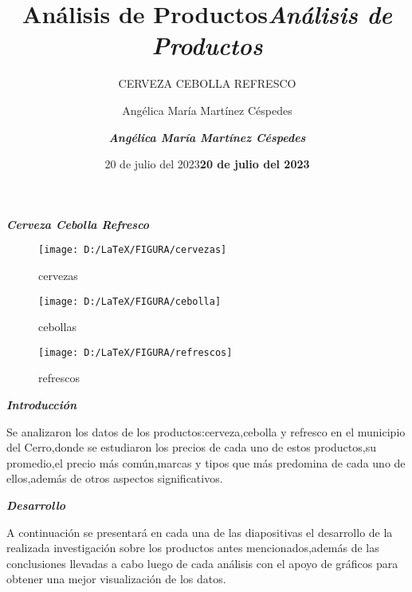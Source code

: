 \documentclass[10pt]{beamer}
\title{Análisis de Productos}
\author{Angélica María Martínez Céspedes}
\date{20 de julio del 2023}
\begin{document}
    \title{{\Huge \textbf{\textit{Análisis de Productos}}}}
    \author{\textbf{\textit{Angélica María Martínez Céspedes}}}
    \date{\textbf{20 de julio del 2023}}
    \subtitle{CERVEZA CEBOLLA REFRESCO}
  
   
   	\begin{frame}
   		\titlepage
   	\end{frame}
   	
   
   	
  
   	\begin{frame}
   		\begin{center}
   			{\LARGE{\textbf{\textit{Cerveza  Cebolla  Refresco}}}}
   		\end{center}
   		
   		\begin{figure}[p]
   			\centering
   			\texttt{[image: D:/LaTeX/FIGURA/cervezas]}
   			\caption{cervezas}
   			\label{fig:cervezas}
   		\end{figure}
   	
   	    \begin{figure}[t]
   		 \centering
   		 \texttt{[image: D:/LaTeX/FIGURA/cebolla]}
   	   	 \caption{cebollas}
   		 \label{fig:cebolla}
    	\end{figure}
   	
   	
   	  
   	   \begin{figure}
   		\centering
   		\texttt{[image: D:/LaTeX/FIGURA/refrescos]}
   		\caption{refrescos}
   		\label{fig:refrescos}
   	   \end{figure}
   	
   	\end{frame}
   	
   	 	
   	\begin{frame}{\textbf{\textit{Introducción}}}
   	 \begin{center}
   			Se analizaron los datos de los productos:cerveza,cebolla y refresco en el municipio del Cerro,donde se estudiaron los precios de cada uno de estos productos,su promedio,el precio más común,marcas y tipos que más predomina de cada uno de ellos,además de otros aspectos significativos.
   	 \end{center}
   	\end{frame}
   	
   	\begin{frame}{\textbf{\textit{Desarrollo}}}
   		
   		A continuación se presentará en cada una de las diapositivas el desarrollo de la realizada investigación sobre los productos antes mencionados,además de las conclusiones llevadas a cabo luego de cada análisis con el apoyo de gráficos para obtener una mejor visualización de los datos. 
   	
   	       
   	
   	\end{frame}	
   		
\end{document}
